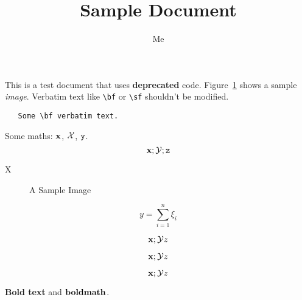 \documentclass[12pt,a4paper]{article}
\title{Sample Document}
\author{Me}
\newcommand{\boldstuff}[1]{{\bf #1}}
\begin{document}
\maketitle

This is a test {\sf document} that uses {\bf deprecated} code.
Figure~\ref{fig:sample} shows a sample {\it image}.
  Verbatim text like \verb|\bf| or \verb|\sf| shouldn't be
modified. 
\begin{verbatim}
   Some \bf verbatim text.
\end{verbatim}

Some maths: $\bf x$, \begin{math}\cal X\end{math},
\(\tt y\).
\[
  {\bf x}; {\cal Y}; {\tt z}
\]

   \centerline{X}

\begin{figure}
\centerline{}
\caption{A Sample Image}
\label{fig:sample}
\end{figure}

$$y = \sum_{i=1}^n \xi_i$$

$${\bf x}; {\cal Y} {\it z}$$

\begin{displaymath}
{\bf x}; {\cal Y} {\it z}
\end{displaymath}

\begin{equation}
{\bf x}; {\cal Y} {\it z}
\end{equation}

\boldstuff{Bold text} and $\boldstuff{bold math}$.
\end{document}
